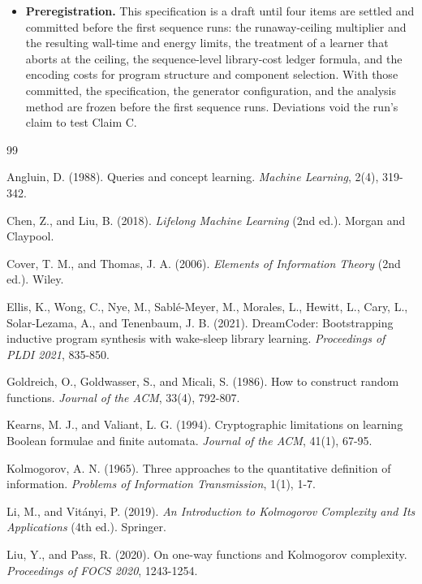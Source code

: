 \documentclass[11pt]{article}
\begin{document}
\begin{itemize}
\item \textbf{Preregistration.} This specification is a draft until four items are settled and committed before the first sequence runs: the runaway-ceiling multiplier and the resulting wall-time and energy limits, the treatment of a learner that aborts at the ceiling, the sequence-level library-cost ledger formula, and the encoding costs for program structure and component selection. With those committed, the specification, the generator configuration, and the analysis method are frozen before the first sequence runs. Deviations void the run's claim to test Claim C.
\end{itemize}

\begin{thebibliography}{99}
\small
\setlength{\itemsep}{0pt}
\setlength{\parsep}{0pt}

 Angluin, D. (1988). Queries and concept learning. \emph{Machine Learning}, 2(4), 319-342.

 Chen, Z., and Liu, B. (2018). \emph{Lifelong Machine Learning} (2nd ed.). Morgan and Claypool.

 Cover, T. M., and Thomas, J. A. (2006). \emph{Elements of Information Theory} (2nd ed.). Wiley.

 Ellis, K., Wong, C., Nye, M., Sabl\'e-Meyer, M., Morales, L., Hewitt, L., Cary, L., Solar-Lezama, A., and Tenenbaum, J. B. (2021). DreamCoder: Bootstrapping inductive program synthesis with wake-sleep library learning. \emph{Proceedings of PLDI 2021}, 835-850.

 Goldreich, O., Goldwasser, S., and Micali, S. (1986). How to construct random functions. \emph{Journal of the ACM}, 33(4), 792-807.

 Kearns, M. J., and Valiant, L. G. (1994). Cryptographic limitations on learning Boolean formulae and finite automata. \emph{Journal of the ACM}, 41(1), 67-95.

 Kolmogorov, A. N. (1965). Three approaches to the quantitative definition of information. \emph{Problems of Information Transmission}, 1(1), 1-7.

 Li, M., and Vit\'anyi, P. (2019). \emph{An Introduction to Kolmogorov Complexity and Its Applications} (4th ed.). Springer.

 Liu, Y., and Pass, R. (2020). On one-way functions and Kolmogorov complexity. \emph{Proceedings of FOCS 2020}, 1243-1254.


\end{thebibliography}
\end{document}
